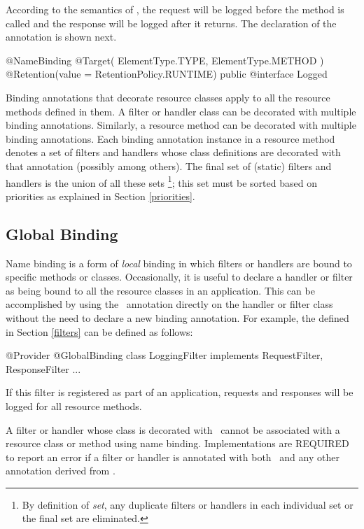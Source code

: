 According to the semantics of , the request will be logged before the  method is called and the response will be logged after it returns. The declaration of the  annotation is shown next.

\begin{listing}{1}
@NameBinding
@Target({ ElementType.TYPE, ElementType.METHOD })
@Retention(value = RetentionPolicy.RUNTIME)
public @interface Logged { }
\end{listing}

Binding annotations that decorate resource classes apply to all the resource methods defined in them. A filter or handler class can be decorated with multiple binding annotations. Similarly, a resource method can be decorated with multiple binding annotations.  Each binding annotation instance in a resource method denotes a set of filters and handlers whose class definitions are decorated with that annotation (possibly among others). The final set of (static) filters and handlers is the union of all these sets \footnote{By definition of {\em set}, any duplicate filters or handlers in each individual set or the final set are eliminated.}; this set must be sorted based on priorities as explained in Section \ref{priorities}. 

\subsection{Global Binding}

Name binding is a form of {\em local} binding in which filters or handlers are bound to specific methods or classes. Occasionally, it is useful to declare a handler or filter as being bound to all the resource classes in an application. This can be accomplished by using the \GlobalBinding\ annotation directly on the handler or filter class without the need to declare a new binding annotation. For example, the  defined in Section \ref{filters} can be defined as follows:

\begin{listing}{1}
@Provider
@GlobalBinding
class LoggingFilter implements RequestFilter, ResponseFilter {
    ...
}
\end{listing}

If this filter is registered as part of an application, requests and responses will be logged for all resource methods. 

A filter or handler whose class is decorated with \GlobalBinding\ cannot be associated with a resource class or method using name binding. Implementations are REQUIRED to report an error if a filter or handler is annotated with both \GlobalBinding\ and any other annotation derived from \NameBinding.

